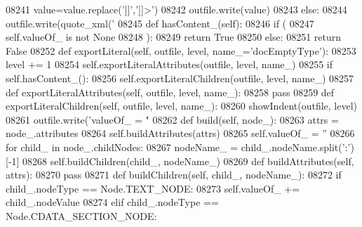 \begin{DoxyCode}
{{{{{{{{{{{{{{{{{{{{{{{{{{{{{{{{{{{{{{{{{{{{{{{{{{{{{{{{{{{{{{{{{{{{{{{{{{{{{{{{{{{{{{{{{{{{{{{{{{{{{{{{{{{{{{{{{{{{{{{{{{{{{{{{{{{{{{{{{{{{{{{{{{{{{{{{{{{{{{{{{{{{{{{{{{{{{{{{{{{{{{{{{{{{{{{{{{{{{{{{{{{{{{{{{{{{{{{{{{{{{{{{{{{{{{{{{{{{{{{{{{{{{{{{{{{{{{{{{{{{{{{{{{{{{{{{{{{{{{{{{{{{{{{{{{{{{{{{{{{{{{{{{{{{{{{{{{{{{{{{{{{{{{{{{{{{{{{{{{{{{{{{{{{{{{{{{{{{{{{{{{{{{{{{{{{{{{{{{{{{{{{{{{{{{{{{{{{{{{{{{{{{{{{{{{{{{{{{{{{{{{{{{{{{{{{{{{{{{{{{{{{{{{{{{{{{{{{{{{{{{{{{{{{{{{{{{{{{{{{{{{{{{{{{{{{{{{{{{{{{{{{{{{08241             value=value.replace(\textcolor{stringliteral}{']]'},\textcolor{stringliteral}{']]>'})
08242             outfile.write(value)
08243         \textcolor{keywordflow}{else}:
08244             outfile.write(quote_xml(\textcolor{stringliteral}{'%
08245     \textcolor{keyword}{def }hasContent_(self):
08246         \textcolor{keywordflow}{if} (
08247             self.valueOf_ \textcolor{keywordflow}{is} \textcolor{keywordflow}{not} \textcolor{keywordtype}{None}
08248             ):
08249             \textcolor{keywordflow}{return} \textcolor{keyword}{True}
08250         \textcolor{keywordflow}{else}:
08251             \textcolor{keywordflow}{return} \textcolor{keyword}{False}
08252     \textcolor{keyword}{def }exportLiteral(self, outfile, level, name\_='docEmptyType'):
08253         level += 1
08254         self.exportLiteralAttributes(outfile, level, name\_)
08255         \textcolor{keywordflow}{if} self.hasContent_():
08256             self.exportLiteralChildren(outfile, level, name\_)
08257     \textcolor{keyword}{def }exportLiteralAttributes(self, outfile, level, name\_):
08258         \textcolor{keywordflow}{pass}
08259     \textcolor{keyword}{def }exportLiteralChildren(self, outfile, level, name\_):
08260         showIndent(outfile, level)
08261         outfile.write(\textcolor{stringliteral}{'valueOf\_ = "%
08262     \textcolor{keyword}{def }build(self, node\_):
08263         attrs = node\_.attributes
08264         self.buildAttributes(attrs)
08265         self.valueOf_ = \textcolor{stringliteral}{''}
08266         \textcolor{keywordflow}{for} child\_ \textcolor{keywordflow}{in} node\_.childNodes:
08267             nodeName\_ = child\_.nodeName.split(\textcolor{stringliteral}{':'})[-1]
08268             self.buildChildren(child\_, nodeName\_)
08269     \textcolor{keyword}{def }buildAttributes(self, attrs):
08270         \textcolor{keywordflow}{pass}
08271     \textcolor{keyword}{def }buildChildren(self, child\_, nodeName\_):
08272         \textcolor{keywordflow}{if} child\_.nodeType == Node.TEXT\_NODE:
08273             self.valueOf\_ += child\_.nodeValue
08274         \textcolor{keywordflow}{elif} child\_.nodeType == Node.CDATA\_SECTION\_NODE:
}}}}}}}}}}}}}}}}}}}}}}}}}}}}}}}}}}}}}}}}}}}}}}}}}}}}}}}}}}}}}}}}}}}}}}}}}}}}}}}}}}}}}}}}}}}}}}}}}}}}}}}}}}}}}}}}}}}}}}}}}}}}}}}}}}}}}}}}}}}}}}}}}}}}}}}}}}}}}}}}}}}}}}}}}}}}}}}}}}}}}}}}}}}}}}}}}}}}}}}}}}}}}}}}}}}}}}}}}}}}}}}}}}}}}}}}}}}}}}}}}}}}}}}}}}}}}}}}}}}}}}}}}}}}}}}}}}}}}}}}}}}}}}}}}}}}}}}}}}}}}}}}}}}}}}}}}}}}}}}}}}}}}}}}}}}}}}}}}}}}}}}}}}}}}}}}}}}}}}}}}}}}}}}}}}}}}}}}}}}}}}}}}}}}}}}}}}}}}}}}}}}}}}}}}}}}}}}}}}}}}}}}}}}}}}}}}}}}}}}}}}}}}}}}}}}}}}}}}}}}}}}}}}}}}}}}}}}}}}}}}}}}}}}}}}}}}}}}}}}}}}}}}}}}
\end{DoxyCode}
